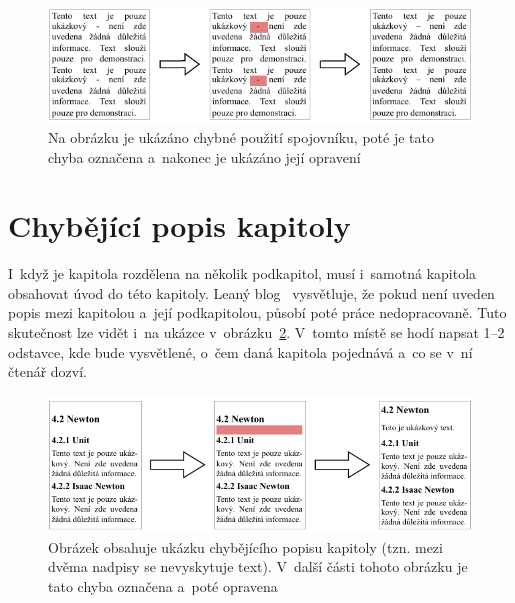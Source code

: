 \begin{figure}[H]
    \centering
    \includegraphics[width=\linewidth]{obrazky-figures/dash_example.pdf}
    \caption{
        Na obrázku je ukázáno chybné použití spojovníku, poté je tato chyba
        označena a~nakonec je ukázáno její opravení
    }
    \label{pic_hyphen}
\end{figure}


\section{Chybějící popis kapitoly}

I~když je kapitola rozdělena na několik podkapitol, musí i~samotná kapitola
obsahovat úvod do této kapitoly. Leaný blog~\cite{Leany_blog} vysvětluje, že 
pokud není uveden
popis mezi kapitolou a~její podkapitolou, působí poté práce nedopracovaně. Tuto
skutečnost lze vidět i~na ukázce v~obrázku~\ref{pic_chapter_introduction}. V~tomto místě
se hodí napsat 1--2 odstavce, kde bude vysvětlené, o~čem daná kapitola pojednává a~co se
v~ní čtenář dozví.

\begin{figure}[H]
    \centering
    \includegraphics[width=\linewidth]{obrazky-figures/chapter_introduction_example.pdf}
    \caption{
        Obrázek obsahuje ukázku chybějícího popisu kapitoly (tzn. mezi dvěma
        nadpisy se nevyskytuje text). V~další části tohoto obrázku je tato 
        chyba označena a~poté opravena
    }
    \label{pic_chapter_introduction}
\end{figure}


